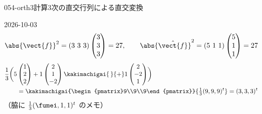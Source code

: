 \documentclass[uplatex,dvipdfmx,a4paper,11pt]{jsarticle}
\begin{document}
\begin{mondai}{054-orth3}{計算}{3次の直交行列による直交変換}
\begin{kotaeutsushi}{2026-10-03}
\[\]
\[
  \abs{\vect{f}}^{2}=(3\ 3\ 3)\begin{pmatrix}3\\3\\3\end{pmatrix}=27,\qquad
  \abs{\hat{\vect{f}}}^{2}=(5\ 1\ 1)\begin{pmatrix}5\\1\\1\end{pmatrix}=27
\]
\begin{align*}
  &\frac{1}{3}\biggl(5\begin{pmatrix}1\\2\\2\end{pmatrix}+1\begin{pmatrix}2\\1\\-2\end{pmatrix}\kakimachigai{\,}{+}1\begin{pmatrix}2\\-2\\1\end{pmatrix}\biggr)\\
  &\qquad=\kakimachigai{\begin{pmatrix}9\\9\\9\end{pmatrix}}{\tfrac{1}{3}(9,9,9)^{t}}=(3,3,3)^{t}
\end{align*}
（脇に $\frac{1}{3}(\fumei,1,1)^{t}$ のメモ）
\end{kotaeutsushi}
\end{mondai}
\end{document}
